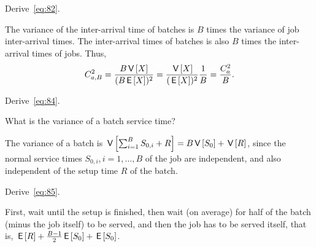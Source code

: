 \begin{extra}
Derive~\cref{eq:82}.
  \begin{solution}
The variance of the inter-arrival time of batches is $B$ times the variance of job inter-arrival times. The inter-arrival times of batches is also $B$ times the inter-arrival times of jobs. Thus, 
\begin{equation*}
  C_{a,B}^2 = \frac{B \,\mathsf{V}\left[X\right]}{(B \,\mathsf{E}\left[X\right])^2} = \frac{\,\mathsf{V}\left[X\right]}{(\,\mathsf{E}\left[X\right])^2} \frac 1 B =  \frac{C_a^2}{B}.
\end{equation*}
  \end{solution}
\end{extra}


\begin{extra}
Derive~\cref{eq:84}.
\begin{hint}
  What is the variance of a batch service time?
\end{hint}
\begin{solution}
  The variance of a batch is $\,\mathsf{V}\left[\sum_{i=1}^B S_{0,i} + R\right] = B\,\mathsf{V}\left[S_0\right] + \,\mathsf{V}\left[R\right]$, since the normal service times $S_{0,i}, i=1,\ldots, B$ of the job are independent, and also independent of the setup time $R$ of the batch.
\end{solution}
\end{extra}



\begin{extra}
 Derive~\cref{eq:85}.
\begin{solution}
  First, wait until the setup is finished,  then wait (on average) for half of the batch (minus the job itself) to be served, and then the job has to be served itself, that is,
$\,\mathsf{E}\left[R\right]  + \frac{B-1}{2}\,\mathsf{E}\left[S_0\right] +\,\mathsf{E}\left[S_0\right]$.
\end{solution}
\end{extra}




